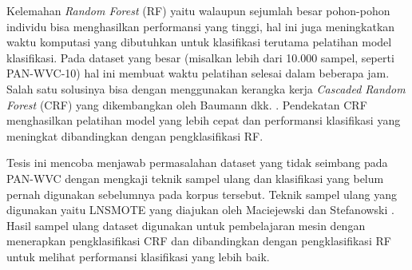 Kelemahan \textit{Random Forest} (RF) yaitu walaupun sejumlah besar pohon-pohon
individu bisa menghasilkan performansi yang tinggi, hal ini juga meningkatkan
waktu komputasi yang dibutuhkan untuk klasifikasi terutama pelatihan
model klasifikasi.
Pada dataset yang besar (misalkan lebih dari 10.000 sampel, seperti
PAN-WVC-10) hal ini membuat waktu pelatihan selesai dalam beberapa jam.
Salah satu solusinya bisa dengan menggunakan kerangka kerja
\textit{Cascaded Random Forest} (CRF)
yang dikembangkan oleh Baumann dkk.
\cite{baumann2013cascaded}.
Pendekatan CRF menghasilkan pelatihan model yang lebih cepat dan performansi
klasifikasi yang meningkat dibandingkan dengan pengklasifikasi RF.

Tesis ini mencoba menjawab permasalahan dataset yang tidak seimbang pada
PAN-WVC dengan mengkaji teknik sampel ulang dan klasifikasi yang belum pernah
digunakan sebelumnya pada korpus tersebut.
Teknik sampel ulang yang digunakan yaitu LNSMOTE yang diajukan oleh Maciejewski
dan Stefanowski \cite{maciejewski2011local}.
Hasil sampel ulang dataset digunakan untuk pembelajaran mesin dengan menerapkan
pengklasifikasi CRF dan dibandingkan dengan pengklasifikasi RF untuk melihat
performansi klasifikasi yang lebih baik.
